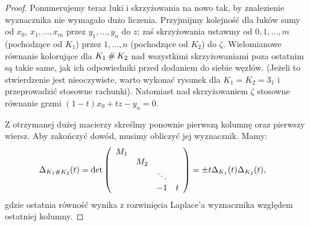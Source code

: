 \begin{proof}
\begin{comment}
            \strand[thick] (30, 10) [in=right, out=left] to (25, 10) to (10, -10);
            \strand[thick,latex-] (30, -10) [in=right, out=left] to (25, -10) to (10, 10);

            \node[darkblue] at (-50,10) [below] {$x_1,\ldots,x_{m-1}$};
            \node[red] at (-50,-10) [above] {$1,\ldots,m$};

            \node[darkblue] at (50,10) [below] {$y_1,\ldots,y_{n-1}$};
            \node[red] at (50,-10) [above] {$1,\ldots,n$};

            \node[darkblue] at (-20,-10)[below] {$x_m$};
            \node[darkblue] at (0, 10)[above] {$z$};
            \node[darkblue] at (25,-10)[below] {$y_n$};
            \node[darkblue] at (0, -10)[below] {$x_0 = y_0$};
            \node[red] at ( 20,  0)[right]{$\zeta$};
            \node[red] at (-20,  0)[left]{$0$};
        \end{knot}
    \end{tikzpicture}\]
\end{comment}

    Ponumerujemy teraz łuki i skrzyżowania na nowo tak, by znalezienie wyznacznika nie wymagało dużo liczenia.
    Przyjmijmy kolejność dla łuków sumy od $x_0$, $x_1, \ldots, x_m$ przez $y_1, \ldots, y_n$ do $z$; zaś skrzyżowania ustawmy od $0, 1, \ldots, m$ (pochodzące od $K_1$) przez $1, \ldots, n$ (pochodzące od $K_2$) do $\zeta$.
    Wielomianowe równanie kolorujące dla $K_1 \mathbin{\#} K_2$ nad wszystkimi skrzyżowaniami poza ostatnim są takie same, jak ich odpowiedniki przed dodaniem do siebie węzłów.
    (Jeżeli to stwierdzenie jest nieoczywiste, warto wykonać rysunek dla $K_1 = K_2 = 3_1$ i przeprowadzić stosowne rachunki).
    Natomiast nad skrzyżowaniem $\zeta$ stosowne równanie grzmi $(1-t)x_0 + tz - y_n = 0$.

    Z otrzymanej dużej macierzy skreślmy ponownie pierwszą kolumnę oraz pierwszy wiersz.
    Aby zakończyć dowód, musimy obliczyć jej wyznacznik.
    Mamy:
    \begin{align*}
        \Delta_{K_1 \mathbin{\#} K_2}(t) & = \det \left(\begin{array}{cccc}
            M_1 &     &        & \\
                & M_2 &        & \\
                &     & \ddots & \\
                &     & -1     & t
    \end{array}\right) = \pm t \Delta_{K_1}(t) \Delta_{K_2}(t),
    \end{align*}
    gdzie ostatnia równość wynika z rozwinięcia Laplace'a wyznacznika względem ostatniej kolumny.
\end{proof}

